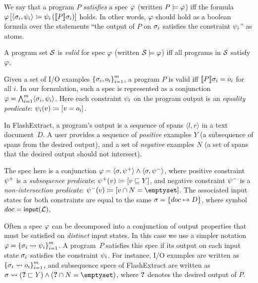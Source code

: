 \begin{defn}
    We say that a program $P$ \emph{satisfies} a spec $\varphi$ (written $P \models \varphi$) iff the formula
    $\varphi\left[ \langle \sigma_i, \psi_i\rangle \coloneqq \psi_i\left(\llbracket P \rrbracket{\ensuremath{\sigma}_i}\right)
    \right]$ holds.
    In other words, $\varphi$ should hold as a boolean formula over the statements ``the output of $P$ on $\sigma_i$
    satisfies the constraint $\psi_i$'' as atoms.
\end{defn}

\begin{defn}
    A program set $\mathcal{S}$ is \emph{valid} for spec $\varphi$ (written $\mathcal{S} \models \varphi$) iff all programs in $\mathcal{S}$
    satisfy $\varphi$.
\end{defn}

\begin{example}
    Given a set of I/O examples $\left\{\sigma_i, o_i\right\}_{i=1}^m$,
    a program $P$ is valid iff $\llbracket P \rrbracket{\ensuremath{\sigma}_i} = o_i$ for all $i$.
    In our formulation, such a spec is represented as a conjunction $\varphi = \bigwedge_{i=1}^m \langle \sigma_i,
    \psi_i\rangle$.
    Here each constraint $\psi_i$ on the program output is an \emph{equality predicate}:
    $\psi_i(v) \coloneqq [v = o_i]$.
\end{example}

\begin{example}
    In FlashExtract, a program's output is a sequence of spans $\langle l, r\rangle$ in a text document~$D$.
    A user provides a sequence of \emph{positive} examples $Y$ (a subsequence of spans from the desired
    output), and a set of \emph{negative} examples $N$ (a set of spans that the desired output should not intersect).

    The spec here is a conjunction $\varphi = \langle \sigma, \psi^+\rangle \wedge
    \langle\sigma,\psi^-\rangle$, where positive constraint $\psi^+$ is a \emph{subsequence predicate}:
    $\psi^+(v) \coloneqq [v \sqsubseteq Y]$, and negative constraint $\psi^-$ is a
    \emph{non-intersection predicate}: $\constraint^-(v) \coloneqq [v \cap N = \emptyset]$.
    The associated input states for both constraints are equal to the same $\sigma = \left\{doc \mapsto D\right\}$,
    where symbol $doc = \mathsf{input}(\mathcal{L})$.
    \label{ex:dsl:flashextract}
\end{example}

Often a spec $\varphi$ can be decomposed into a conjunction of output properties that must be satisfied on \emph{distinct}
input states.
In this case we use a simpler notation $\varphi = \left\{ \sigma_i \rightsquigarrow \psi_i \right\}_{i=1}^m$.
A program~$P$ satisfies this spec if its output on each input state $\sigma_i$ satisfies the constraint $\psi_i$.
For instance, I/O examples are written as $\left\{\sigma_i \rightsquigarrow o_i\right\}_{i=1}^m$, and
subsequence specs of FlashExtract are written as $\state \rightsquigarrow (\result \sqsubset Y) \wedge (\result
\cap N = \emptyset)$, where $\text{\bfseries ?}$ denotes the desired output of $P$.

